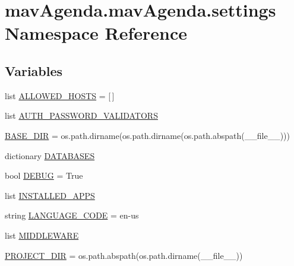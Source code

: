 \hypertarget{namespacemavAgenda_1_1mavAgenda_1_1settings}{}\section{mav\+Agenda.\+mav\+Agenda.\+settings Namespace Reference}
\label{namespacemavAgenda_1_1mavAgenda_1_1settings}
\subsection*{Variables}
\begin{DoxyCompactItemize}
\item 
list \mbox{\hyperlink{namespacemavAgenda_1_1mavAgenda_1_1settings_ae6b895f9afe49d0e51d3f345ff7c5525}{A\+L\+L\+O\+W\+E\+D\+\_\+\+H\+O\+S\+TS}} = \mbox{[}$\,$\mbox{]}
\item 
list \mbox{\hyperlink{namespacemavAgenda_1_1mavAgenda_1_1settings_a555250124fcbb58436b50248c49b55b6}{A\+U\+T\+H\+\_\+\+P\+A\+S\+S\+W\+O\+R\+D\+\_\+\+V\+A\+L\+I\+D\+A\+T\+O\+RS}}
\item 
\mbox{\hyperlink{namespacemavAgenda_1_1mavAgenda_1_1settings_ac2a1051d132263e80427d9680d0c7e6c}{B\+A\+S\+E\+\_\+\+D\+IR}} = os.\+path.\+dirname(os.\+path.\+dirname(os.\+path.\+abspath(\+\_\+\+\_\+file\+\_\+\+\_\+)))
\item 
dictionary \mbox{\hyperlink{namespacemavAgenda_1_1mavAgenda_1_1settings_a7523f638d8f5aa5b8938f2100fe672b0}{D\+A\+T\+A\+B\+A\+S\+ES}}
\item 
bool \mbox{\hyperlink{namespacemavAgenda_1_1mavAgenda_1_1settings_a074f2dc4c13952db560d3f41d8a90809}{D\+E\+B\+UG}} = True
\item 
list \mbox{\hyperlink{namespacemavAgenda_1_1mavAgenda_1_1settings_abef116c8f28b211dcef5b323688ede86}{I\+N\+S\+T\+A\+L\+L\+E\+D\+\_\+\+A\+P\+PS}}
\item 
string \mbox{\hyperlink{namespacemavAgenda_1_1mavAgenda_1_1settings_ad7952a2ee938e38fe5569abad32d3dda}{L\+A\+N\+G\+U\+A\+G\+E\+\_\+\+C\+O\+DE}} = \textquotesingle{}en-\/us\textquotesingle{}
\item 
list \mbox{\hyperlink{namespacemavAgenda_1_1mavAgenda_1_1settings_af9a82d96da5e11b79f4d87886a52c8d5}{M\+I\+D\+D\+L\+E\+W\+A\+RE}}
\item 
\mbox{\hyperlink{namespacemavAgenda_1_1mavAgenda_1_1settings_a430f2b0e8bf474dabb9115742e1a867c}{P\+R\+O\+J\+E\+C\+T\+\_\+\+D\+IR}} = os.\+path.\+abspath(os.\+path.\+dirname(\+\_\+\+\_\+file\+\_\+\+\_\+))
\item 

\end{DoxyCompactItemize}
